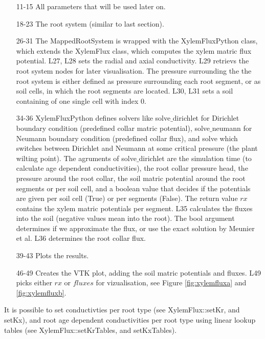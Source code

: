 
\begin{itemize}

\item[11-15] All parameters that will be used later on.

\item[18-23] The root system (similar to last section). 

\item[26-31] The MappedRootSystem is wrapped with the XylemFluxPython class, which extends the XylemFlux class, which computes the xylem matric flux potential. L27, L28 sets the radial and axial conductivity. L29 retrievs the root system nodes for later visualisation. The pressure surrounding the the root system is either defined as pressure surrounding each root segment, or as soil cells, in which the root segments are located. L30, L31 sets a soil containing of one single cell with index 0. 

\item[34-36] XylemFluxPython defines solvers like solve$\_$dirichlet for Dirichlet boundary condition (predefined collar matric potential), solve$\_$neumann for Neumann boundary condition (predefined collar flux), and solve which switches between Dirichlet and Neumann at some critical pressure (the plant wilting point).
The agruments of solve$\_$dirichlet are the simulation time (to calculate age dependent conductivities), the root collar pressure head, the pressure around the root collar, the soil matric potential around the root segments or per soil cell, and a boolean value that decides if the potentials are given per soil cell (True) or per segments (False). The return value $rx$ contains the xylem matric potentials per segment. L35 calculates the fluxes into the soil (negative values mean into the root). The bool argument determines if we approximate the flux, or use the exact solution by Meunier et al. %
L36 determines the root collar flux.

\item[39-43] Plots the results.

\item[46-49] Creates the VTK plot, adding the soil matric potentials and fluxes. L49 picks either $rx$ or $fluxes$ for vizualisation, see Figure \ref{fig:xylemfluxa} and \ref{fig:xylemfluxb}.

\end{itemize}

It is possible to set conductivties per root type (see XylemFlux::setKr, and setKx), and root age dependent conductivities per root type using linear lookup tables (see XylemFlux::setKrTables, and setKxTables).

